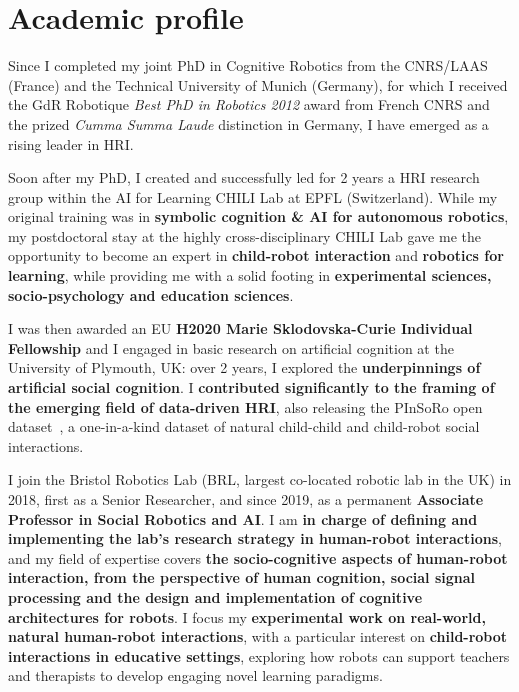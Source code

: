 
\section{Academic profile}\label{early-achievements-track-record}


Since I completed my joint PhD in Cognitive Robotics from the CNRS/LAAS (France) and the
Technical University of Munich (Germany), for which I received the GdR Robotique \emph{Best
PhD in Robotics 2012} award from French CNRS and the prized \emph{Cumma Summa
Laude} distinction in Germany, I have emerged as a rising leader in
HRI.

Soon after my PhD, I created and successfully led for 2 years a HRI research
group within the AI for Learning CHILI Lab at EPFL (Switzerland). While my
original training was in \textbf{symbolic cognition \& AI for autonomous
robotics}, my postdoctoral stay at the highly cross-disciplinary CHILI Lab gave
me the opportunity to become an expert in \textbf{child-robot interaction} and
\textbf{robotics for learning}, while providing me with a solid footing in
\textbf{experimental sciences, socio-psychology and education sciences}.

I was then awarded an EU \textbf{H2020 Marie Sklodovska-Curie Individual
Fellowship} and I engaged in basic research on artificial cognition at the
University of Plymouth, UK: over 2 years, I explored the \textbf{underpinnings
of artificial social cognition}. I \textbf{contributed significantly to the
framing of the emerging field of data-driven HRI}, also releasing the PInSoRo
open dataset~\cite{pinsoro2018}, a
one-in-a-kind dataset of natural child-child and child-robot social
interactions.

I join the Bristol Robotics Lab (BRL, largest co-located robotic lab in the UK)
in 2018, first as a Senior Researcher, and since 2019, as a permanent
\textbf{Associate Professor in Social Robotics and AI}. I am \textbf{in charge
of defining and implementing the lab's research strategy in human-robot
interactions}, and my field of expertise covers \textbf{the socio-cognitive
aspects of human-robot interaction, from the perspective of human cognition,
social signal processing and the design and implementation of cognitive
architectures for robots}. I focus my
\textbf{experimental work on real-world, natural human-robot interactions}, with
a particular interest on \textbf{child-robot interactions in educative
settings}, exploring how robots can support teachers and therapists to develop
engaging novel learning paradigms.


